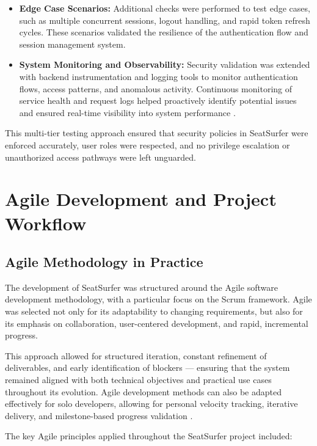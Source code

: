 \documentclass[12pt,a4paper]{report} %
\begin{document}
\begin{itemize}
\item \textbf{Edge Case Scenarios:}  
Additional checks were performed to test edge cases, such as multiple concurrent sessions, logout handling, and rapid token refresh cycles. These scenarios validated the resilience of the authentication flow and session management system.

\item \textbf{System Monitoring and Observability:}  
Security validation was extended with backend instrumentation and logging tools to monitor authentication flows, access patterns, and anomalous activity. Continuous monitoring of service health and request logs helped proactively identify potential issues and ensured real-time visibility into system performance \cite{miller2021microservices}.
\end{itemize}

This multi-tier testing approach ensured that security policies in SeatSurfer were enforced accurately, user roles were respected, and no privilege escalation or unauthorized access pathways were left unguarded.

\newpage

\section{Agile Development and Project Workflow}

\subsection{Agile Methodology in Practice}

The development of SeatSurfer was structured around the Agile software development methodology, with a particular focus on the Scrum framework. Agile was selected not only for its adaptability to changing requirements, but also for its emphasis on collaboration, user-centered development, and rapid, incremental progress.

This approach allowed for structured iteration, constant refinement of deliverables, and early identification of blockers — ensuring that the system remained aligned with both technical objectives and practical use cases throughout its evolution. Agile development methods can also be adapted effectively for solo developers, allowing for personal velocity tracking, iterative delivery, and milestone-based progress validation \cite{smith2022agile}.

The key Agile principles applied throughout the SeatSurfer project included:
\end{document}

